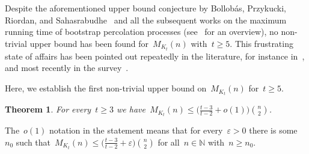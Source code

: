 \documentclass[reqno, 12pt]{amsart}
\numberwithin{equation}{section}
\numberwithin{figure}{section}
\let\epsilon=\varepsilon
\let\eps=\epsilon
\theoremstyle{plain}
\newtheorem{theorem}{Theorem}[section]
\theoremstyle{note}
\theoremstyle{remark}
\begin{document}
    Despite the aforementioned upper bound conjecture by Bollob\'as, Przykucki, Riordan, and Sahasrabudhe~\cite{BPRS:17} and all the subsequent works on the maximum running time of bootstrap percolation processes (see~\cite{FMS:26} for an overview), no non-trivial upper bound has been found for~$M_{K_t}(n)$ with~$t\geq 5$.
    This frustrating state of affairs has been pointed out repeatedly in the literature, for instance in~\cites{BPRS:17,BKPS:26,EJKL:24}, and most recently in the survey~\cite{FMS:26}.
    
    Here, we establish the first non-trivial upper bound on~$M_{K_t}(n)$ for~$t\geq5$.
    


    \begin{theorem}\label{cor:graphcliques}
        For every~$t\geq 3$ we have~$M_{K_t}(n)\leq\big(\frac{t-3}{t-2}+o(1)\big)\binom{n}{2}$.
    \end{theorem}

    The~$o(1)$ notation in the statement means that for every~$\varepsilon>0$ there is some~$n_0$ such that~$M_{K_t}(n)\leq\big(\frac{t-3}{t-2}+\varepsilon\big)\binom{n}{2}$ for all~$n\in\mathds{N}$ with~$n\geq n_0$.
    
\end{document}
